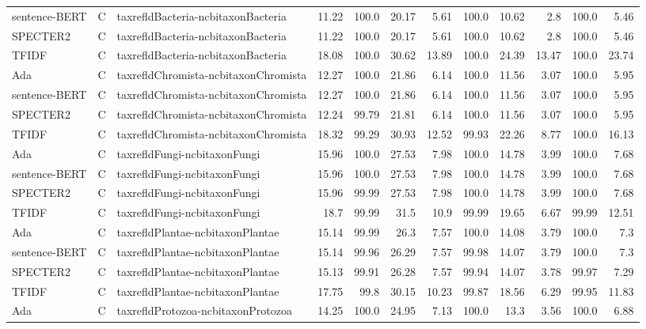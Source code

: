 \begin{table}[h]
\begin{tabular}{|l|c|l|r|r|r|r|r|r|r|r|r|}
	sentence-BERT  & C & taxrefldBacteria-ncbitaxonBacteria  & 11.22 & 100.0 & 20.17 & 5.61 & 100.0 & 10.62 & 2.8 & 100.0 & 5.46\\
	SPECTER2  & C & taxrefldBacteria-ncbitaxonBacteria  & 11.22 & 100.0 & 20.17 & 5.61 & 100.0 & 10.62 & 2.8 & 100.0 & 5.46\\
	TFIDF  & C & taxrefldBacteria-ncbitaxonBacteria  & 18.08 & 100.0 & 30.62 & 13.89 & 100.0 & 24.39 & 13.47 & 100.0 & 23.74\\
	\hline
	Ada  & C & taxrefldChromista-ncbitaxonChromista  & 12.27 & 100.0 & 21.86 & 6.14 & 100.0 & 11.56 & 3.07 & 100.0 & 5.95\\
	sentence-BERT  & C & taxrefldChromista-ncbitaxonChromista  & 12.27 & 100.0 & 21.86 & 6.14 & 100.0 & 11.56 & 3.07 & 100.0 & 5.95\\
	SPECTER2  & C & taxrefldChromista-ncbitaxonChromista  & 12.24 & 99.79 & 21.81 & 6.14 & 100.0 & 11.56 & 3.07 & 100.0 & 5.95\\
	TFIDF  & C & taxrefldChromista-ncbitaxonChromista  & 18.32 & 99.29 & 30.93 & 12.52 & 99.93 & 22.26 & 8.77 & 100.0 & 16.13\\
	\hline
	Ada  & C & taxrefldFungi-ncbitaxonFungi  & 15.96 & 100.0 & 27.53 & 7.98 & 100.0 & 14.78 & 3.99 & 100.0 & 7.68\\
	sentence-BERT  & C & taxrefldFungi-ncbitaxonFungi  & 15.96 & 100.0 & 27.53 & 7.98 & 100.0 & 14.78 & 3.99 & 100.0 & 7.68\\
	SPECTER2  & C & taxrefldFungi-ncbitaxonFungi  & 15.96 & 99.99 & 27.53 & 7.98 & 100.0 & 14.78 & 3.99 & 100.0 & 7.68\\
	TFIDF  & C & taxrefldFungi-ncbitaxonFungi  & 18.7 & 99.99 & 31.5 & 10.9 & 99.99 & 19.65 & 6.67 & 99.99 & 12.51\\
	\hline
	Ada  & C & taxrefldPlantae-ncbitaxonPlantae  & 15.14 & 99.99 & 26.3 & 7.57 & 100.0 & 14.08 & 3.79 & 100.0 & 7.3\\
	sentence-BERT  & C & taxrefldPlantae-ncbitaxonPlantae  & 15.14 & 99.96 & 26.29 & 7.57 & 99.98 & 14.07 & 3.79 & 100.0 & 7.3\\
	SPECTER2  & C & taxrefldPlantae-ncbitaxonPlantae  & 15.13 & 99.91 & 26.28 & 7.57 & 99.94 & 14.07 & 3.78 & 99.97 & 7.29\\
	TFIDF  & C & taxrefldPlantae-ncbitaxonPlantae  & 17.75 & 99.8 & 30.15 & 10.23 & 99.87 & 18.56 & 6.29 & 99.95 & 11.83\\
	\hline
	Ada  & C & taxrefldProtozoa-ncbitaxonProtozoa  & 14.25 & 100.0 & 24.95 & 7.13 & 100.0 & 13.3 & 3.56 & 100.0 & 6.88\\

\end{tabular}
\end{table}
